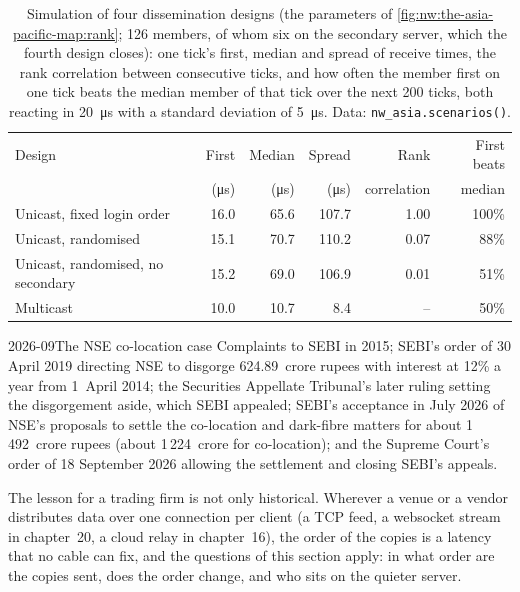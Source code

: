 \begin{table}[ht]
\centering\small
\begin{tabular}{lrrrrr}
\toprule
Design & First & Median & Spread & Rank & First beats \\
 & (\si{\micro\second}) & (\si{\micro\second}) & (\si{\micro\second}) & correlation & median \\
\midrule
Unicast, fixed login order & 16.0 & 65.6 & 107.7 & 1.00 & 100\% \\
Unicast, randomised & 15.1 & 70.7 & 110.2 & 0.07 & 88\% \\
Unicast, randomised, no secondary & 15.2 & 69.0 & 106.9 & 0.01 & 51\% \\
Multicast & 10.0 & 10.7 & 8.4 & -- & 50\% \\
\bottomrule
\end{tabular}
\caption{Simulation of four dissemination designs (the parameters of \cref{fig:nw:the-asia-pacific-map:rank}; 126 members, of whom six on the
secondary server, which the fourth design closes): one tick's first, median and spread of receive times, the rank correlation between
consecutive ticks, and how often the member first on one tick beats the median member of that tick over the next 200 ticks, both reacting in
\qty{20}{\micro\second} with a standard deviation of \qty{5}{\micro\second}. Data: \texttt{nw\_asia.scenarios()}.}\label{tab:nw:the-asia-pacific-map:designs}
\end{table}

\label{lst:nw:the-asia-pacific-map:designs}

\begin{dated}{2026-09}{The NSE co-location case}\label{dat:nw:the-asia-pacific-map:case}
Complaints to SEBI in 2015; SEBI's order of 30 April 2019 directing NSE to disgorge 624.89~crore rupees with interest at 12\% a year from
1~April 2014; the Securities Appellate Tribunal's later ruling setting the disgorgement aside, which SEBI appealed; SEBI's acceptance in July
2026 of NSE's proposals to settle the co-location and dark-fibre matters for about 1\,492~crore rupees (about 1\,224~crore for co-location);
and the Supreme Court's order of 18 September 2026 allowing the settlement and closing SEBI's appeals.
\end{dated}

The lesson for a trading firm is not only historical. Wherever a venue or a vendor distributes data over one connection per client (a
TCP feed, a websocket stream in chapter~20, a cloud relay in chapter~16), the order of the copies is a latency that no cable can fix, and the
questions of this section apply: in what order are the copies sent, does the order change, and who sits on the quieter server.

